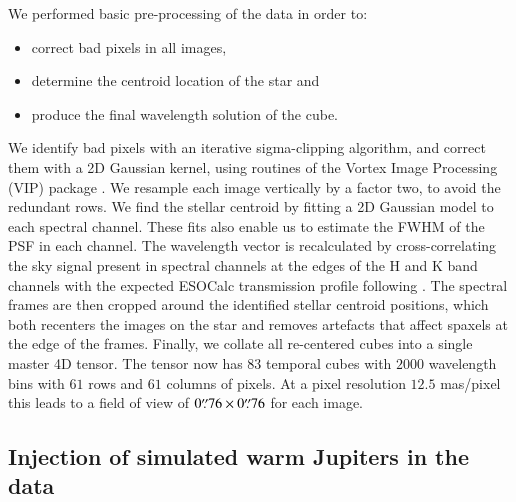 \documentclass{aa}
\begin{document}
We performed basic pre-processing of the data in order to:
\begin{itemize}
    \item correct bad pixels in all images,
    \item determine the centroid location of the star and
    \item produce the final wavelength solution of the cube. 
\end{itemize}
We identify bad pixels with an iterative sigma-clipping algorithm, and correct them with a 2D Gaussian kernel, using routines of the Vortex Image Processing (\textsc{VIP}) package \citep{2017AJGomezVIP,2023Christiaens}.
We resample each image vertically by a factor two, to avoid the redundant rows. 
We find the stellar centroid by fitting a 2D Gaussian model to each spectral channel. 
These fits also enable us to estimate the FWHM of the PSF in each channel. 
The wavelength vector is recalculated by cross-correlating the sky signal present in spectral channels at the edges of the H and K band channels with the expected ESOCalc transmission profile following \cite{2018AHoeijmakersMM}. 
The spectral frames are then cropped around the identified stellar centroid positions, which both recenters the images on the star and removes artefacts that affect spaxels at the edge of the frames.
Finally, we collate all re-centered cubes into a single master 4D tensor.
The tensor now has $83$ temporal cubes with $2000$ wavelength bins with $61$ rows and $61$ columns of pixels.
At a pixel resolution $12.5$ mas/pixel this leads to a field of view of $0\overset{\prime\prime}{.}76 \times 0\overset{\prime\prime}{.}76$ for each image.

\subsection{Injection of simulated warm Jupiters in the data}\label{sec: FC insertion}
\end{document}
